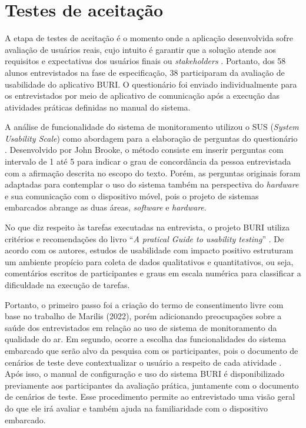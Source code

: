 \section{Testes de aceitação}\label{fase5}

A etapa de testes de aceitação é o momento onde a aplicação desenvolvida sofre avaliação 
de usuários reais, cujo intuito é garantir que a solução atende aos requisitos e expectativas dos usuários finais ou \textit{stakeholders} \cite{system-design-IOT}. 
Portanto, dos 58 alunos entrevistados na fase de especificação, 38 participaram da avaliação de usabilidade do 
aplicativo BURI. O questionário foi enviado individualmente para os entrevistados por meio de aplicativo de comunicação após 
a execução das atividades práticas definidas no manual do sistema.

A análise de funcionalidade do sistema de monitoramento utilizou o SUS (\textit{System Usability Scale}) como abordagem para a elaboração de perguntas do questionário \cite{sus-design-questionario}. Desenvolvido por John Brooke, o método 
consiste em inserir perguntas com intervalo de 1 até 5 para indicar o grau de concordância da pessoa entrevistada com a afirmação descrita no escopo do texto. Porém, as perguntas originais foram adaptadas para contemplar o uso do sistema 
também na perspectiva do \textit{hardware} e sua comunicação com o dispositivo móvel, pois o projeto de sistemas embarcados abrange as duas áreas, \textit{software} e \textit{hardware}.

No que diz respeito às tarefas executadas na entrevista, o projeto BURI utiliza critérios e 
recomendações do livro ``\textit{A pratical Guide to usability testing}'' \cite{tarefas-design}. De acordo com os autores, estudos 
de usabilidade com impacto positivo estruturam um ambiente propício para coleta de dados qualitativos e quantitativos, ou seja, comentários escritos de participantes e 
graus em escala numérica para classificar a dificuldade na execução de tarefas. 

Portanto, o primeiro passo foi a criação do termo de consentimento livre com base no trabalho de Marilis (2022), porém adicionando preocupações sobre a saúde dos entrevistados 
em relação ao uso de sistema de monitoramento da qualidade do ar. Em segundo, ocorre a escolha das funcionalidades do sistema embarcado que serão alvo da pesquisa com os participantes, pois 
o documento de cenários de teste deve contextualizar o usuário a respeito de cada atividade \cite{tarefas-design}. Após isso, o manual de configuração e uso do sistema BURI é disponibilizado 
previamente aos participantes da avaliação prática, juntamente com o documento de cenários de teste. Esse procedimento permite ao entrevistado uma visão geral do que ele irá avaliar e também 
ajuda na familiaridade com o dispositivo embarcado.

